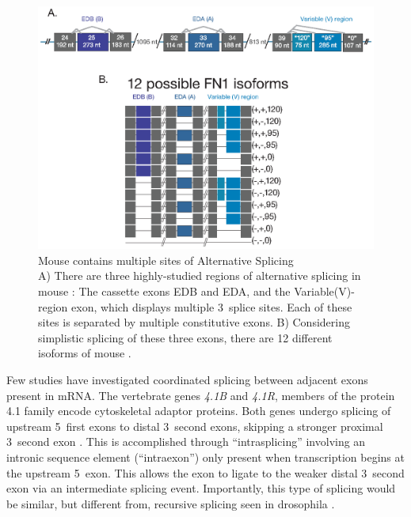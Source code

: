    \begin{figure} %
      \centering 
      \includegraphics{Figures/Intro/Fibronectin.eps}
      \caption[Mouse \fn{} contains multiple sites of Alternative Splicing]
      {
        Mouse \fn{} contains multiple sites of Alternative Splicing\\[0.25cm]
        A) There are three highly-studied regions of alternative splicing in mouse \fn{}: The cassette exons EDB and EDA, and the Variable(V)-region exon, which displays multiple 3\textprime~splice sites.  Each of these sites is separated by multiple constitutive exons. B) Considering simplistic splicing of these three exons, there are 12 different isoforms of mouse \fn{}.
        }
      \label{Intro:fig:mouseFn1}
      \end{figure}

    Few studies have investigated coordinated splicing between adjacent exons present in mRNA. The vertebrate genes \textit{4.1B} and \textit{4.1R}, members of the protein 4.1 family encode cytoskeletal adaptor proteins. Both genes undergo splicing of upstream 5\textprime~first exons to distal 3\textprime~second exons, skipping a stronger proximal 3\textprime~second exon \citep{Parra2008, Parra2012}. This is accomplished through ``intrasplicing'' involving an intronic sequence element (``intraexon'') only present when transcription begins at the upstream 5\textprime~exon. This allows the exon to ligate to the weaker distal 3\textprime~second exon via an intermediate splicing event. Importantly, this type of splicing would be similar, but different from, recursive splicing seen in drosophila \citep{Burnette2005a}.

